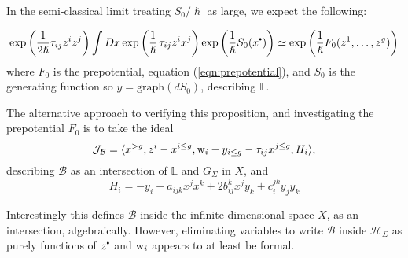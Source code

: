     In the semi-classical limit treating \(S_0/\hslash\) as large, we expect the following:
    \begin{prop}
    \label{prop:transgen}
    \begin{align*} 
    \exp\left( \frac{1}{2 \hslash } \tau_{ij} z^i z^j \right) \int Dx \exp\left( \frac{1}{\hslash} \, \tau_{ij} z^i x^j  \right) \exp\left( \frac{1}{\hslash} S_0(x^{\sbt}) \right) \simeq \exp\left( \frac{1}{\hslash} F_0(z^1, \dots,z^g ) \right) 
    \end{align*}
    where \(F_0\) is the prepotential, equation (\ref{eqn:prepotential}), and \(S_0\) is the generating function so \(y = \mathrm{graph}( dS_0)\), describing \( \mathbb{L}\).
    \end{prop} 
    
    The alternative approach to verifying this proposition, and investigating the prepotential \(F_0\) is to take the ideal
    \[  \mathcal{J}_{\mathcal{B}} = \langle x^{>g}, z^i - x^{i \leq g}, \mathrm{w}_i - y_{i\leq g}-\tau_{ij}x^{j \leq g} , H_i  \rangle,\]
    describing \( \mathcal{B}\) as an intersection of \( \mathbb{L}\) and \(G_\Sigma\) in \(X\), and 
    \[  H_i  = - y_i + a_{ijk}x^j x^k + 2 b_{ij}^k x^j y_k + c_{i}^{jk}y_j y_k\]

    \begin{rem} Interestingly this defines \( \mathcal{B}\) inside the infinite dimensional space \(X\), as an intersection, algebraically. However, eliminating variables to write \( \mathcal{B}\) inside  \( \mathcal{H}_\Sigma\) as purely functions of \(z^{\sbt}\) and \(\mathrm{w}_i\) appears to at least be formal.
    \end{rem}
    
